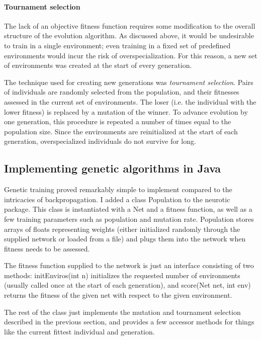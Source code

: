 \documentclass[a4paper]{report}
\newcommand{\code}[1]{{\ttfamily #1}}
\begin{document}
\paragraph{Tournament selection}
The lack of an objective fitness function requires some modification
to the overall structure of the evolution algorithm. As discussed
above, it would be undesirable to train in a single environment; even
training in a fixed set of predefined environments would incur the
risk of overspecialization. For this reason, a new set of environments
was created at the start of every generation.

The technique used for creating new generations was \emph{tournament
  selection}. Pairs of individuals are randomly selected from the
population, and their fitnesses assessed in the current set of
environments. The loser (i.e. the individual with the lower fitness)
is replaced by a mutation of the winner. To advance evolution by one
generation, this procedure is repeated a number of times equal to the
population size. Since the environments are reinitialized at the start
of each generation, overspecialized individuals do not survive for
long.

\subsection{Implementing genetic algorithms in Java}

Genetic training proved remarkably simple to implement compared to the
intricacies of backpropagation. I added a class \code{Population} to
the \code{neurotic} package. This class is instantiated with a
\code{Net} and a fitness function, as well as a few training
parameters such as population and mutation rate. \code{Population}
stores arrays of floats representing weights (either initialized
randomly through the supplied network or loaded from a file) and plugs
them into the network when fitness needs to be assessed.

The fitness function supplied to the network is just an interface
consisting of two methods: \code{initEnviros(int n)} initializes the
requested number of environments (usually called once at the start of
each generation), and \code{score(Net net, int env)} returns the
fitness of the given net with respect to the given environment.

The rest of the class just implements the mutation and tournament
selection described in the previous section, and provides a few
accessor methods for things like the current fittest individual and
generation.
\end{document}
